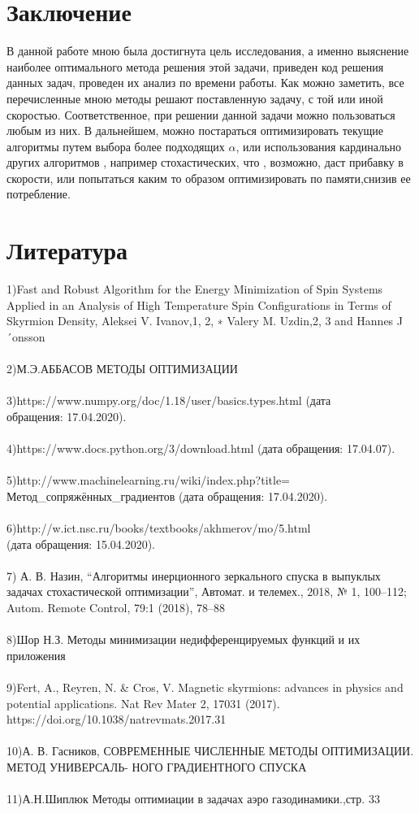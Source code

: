 \documentclass[ 12pt,x11names]{article}
\begin{document}
    \section{Заключение}
    В данной работе мною была достигнута цель исследования, а именно выяснение наиболее оптимального метода решения этой задачи, приведен  код решения данных задач, проведен их анализ по времени работы.
    Как можно заметить, все перечисленные мною методы решают поставленную задачу, с той или иной скоростью. Соответственное, при решении данной задачи можно пользоваться любым из них.
    В дальнейшем, можно постараться оптимизировать текущие алгоритмы  путем выбора более подходящих $\alpha$, или использования кардинально других алгоритмов , например стохастических, что , возможно, даст прибавку в скорости, или попытаться каким то образом оптимизировать по памяти,снизив ее потребление.
\newpage
\section{Литература}
1)Fast and Robust Algorithm for the Energy Minimization of Spin Systems Applied in
an Analysis of High Temperature Spin Configurations in Terms of Skyrmion Density, Aleksei V. Ivanov,1, 2, ∗ Valery M. Uzdin,2, 3 and Hannes J´onsson\\
\\
2)М.Э.АББАСОВ
МЕТОДЫ ОПТИМИЗАЦИИ\\
\\
3)https://www.numpy.org/doc/1.18/user/basics.types.html (дата\\ обращения: 17.04.2020).\\
\\
4)https://www.docs.python.org/3/download.html (дата обращения: 17.04.07).\\
\\
5)http://www.machinelearning.ru/wiki/index.php?title=\\
Метод\_сопряжённых\_градиентов (дата обращения: 17.04.2020).\\
\\
6)http://w.ict.nsc.ru/books/textbooks/akhmerov/mo/5.html\\
(дата обращения: 15.04.2020).\\
\\
7)  А. В. Назин, “Алгоритмы инерционного зеркального спуска в выпуклых задачах стохастической оптимизации”, Автомат. и телемех., 2018, № 1, 100–112; Autom. Remote Control, 79:1 (2018), 78–88\\
\\
8)Шор Н.З. Методы минимизации недифференцируемых функций и их приложения\\
\\
9)Fert, A., Reyren, N. & Cros, V. Magnetic skyrmions: advances in physics and potential applications. Nat Rev Mater 2, 17031 (2017).\\ https://doi.org/10.1038/natrevmats.2017.31\\
\\
10)А. В. Гасников, СОВРЕМЕННЫЕ ЧИСЛЕННЫЕ МЕТОДЫ ОПТИМИЗАЦИИ. МЕТОД УНИВЕРСАЛЬ-
НОГО ГРАДИЕНТНОГО СПУСКА\\
\\
11)А.Н.Шиплюк Методы оптимиации в задачах аэро газодинамики.,стр. 33
\end{document}
